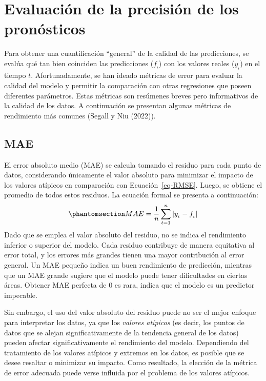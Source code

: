 \documentclass[
  us-letterpaper,
]{scrreprt}
\theoremstyle{definition}
\theoremstyle{plain}
\theoremstyle{plain}
\theoremstyle{definition}
\theoremstyle{remark}
\begin{document}
\section{Evaluación de la precisión de los
pronósticos}\label{evaluaciuxf3n-de-la-precisiuxf3n-de-los-pronuxf3sticos}

Para obtener una cuantificación ``general'' de la calidad de las
predicciones, se evalúa qué tan bien coinciden las predicciones
(\(f_{_t}\)) con los valores reales (\(y_{_t}\)) en el tiempo \(t\).
Afortunadamente, se han ideado métricas de error para evaluar la calidad
del modelo y permitir la comparación con otras regresiones que poseen
diferentes parámetros. Estas métricas son resúmenes breves pero
informativos de la calidad de los datos. A continuación se presentan
algunas métricas de rendimiento más comunes (Segall y Niu (2022)).

\subsection{MAE}\label{mae}

El error absoluto medio (MAE) se calcula tomando el residuo para cada
punto de datos, considerando únicamente el valor absoluto para minimizar
el impacto de los valores atípicos en comparación con
Ecuación~\ref{eq-RMSE}. Luego, se obtiene el promedio de todos estos
residuos. La ecuación formal se presenta a continuación:
\begin{equation}\phantomsection\label{eq-MAE}{MAE= \frac{1}{n}\sum_{t=1}^n |y_{_t}-f_{_t}|}\end{equation}
Dado que se emplea el valor absoluto del residuo, no se indica el
rendimiento inferior o superior del modelo. Cada residuo contribuye de
manera equitativa al error total, y los errores más grandes tienen una
mayor contribución al error general. Un MAE pequeño indica un buen
rendimiento de predicción, mientras que un MAE grande sugiere que el
modelo puede tener dificultades en ciertas áreas. Obtener MAE perfecta
de 0 es rara, indica que el modelo es un predictor impecable.

Sin embargo, el uso del valor absoluto del residuo puede no ser el mejor
enfoque para interpretar los datos, ya que los \emph{valores atípicos}
(es decir, los puntos de datos que se alejan significativamente de la
tendencia general de los datos) pueden afectar significativamente el
rendimiento del modelo. Dependiendo del tratamiento de los valores
atípicos y extremos en los datos, es posible que se desee resaltar o
minimizar su impacto. Como resultado, la elección de la métrica de error
adecuada puede verse influida por el problema de los valores atípicos.
\end{document}
